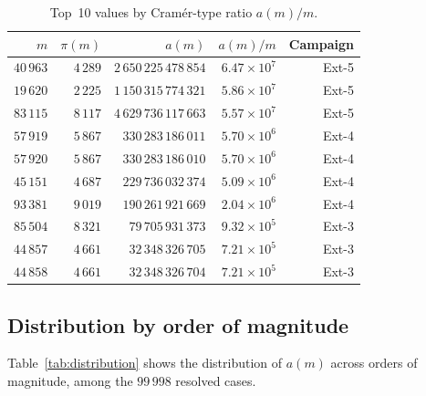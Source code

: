 \documentclass{amsart}
\theoremstyle{definition}
\theoremstyle{remark}
\numberwithin{equation}{section}
\begin{document}
\begin{table}[ht]
\centering
\caption{Top~10 values by Cram\'er-type ratio $a(m)/m$.}
\label{tab:top10_ratio}
\small
\begin{tabular}{rrrrr}
\toprule
$m$ & $\pi(m)$ & $a(m)$ & $a(m)/m$ & Campaign \\
\midrule
$40\,963$ & $4\,289$ & $2\,650\,225\,478\,854$ & $6.47 \times 10^7$ & Ext-5 \\
$19\,620$ & $2\,225$ & $1\,150\,315\,774\,321$ & $5.86 \times 10^7$ & Ext-5 \\
$83\,115$ & $8\,117$ & $4\,629\,736\,117\,663$ & $5.57 \times 10^7$ & Ext-5 \\
$57\,919$ & $5\,867$ & $330\,283\,186\,011$ & $5.70 \times 10^6$ & Ext-4 \\
$57\,920$ & $5\,867$ & $330\,283\,186\,010$ & $5.70 \times 10^6$ & Ext-4 \\
$45\,151$ & $4\,687$ & $229\,736\,032\,374$ & $5.09 \times 10^6$ & Ext-4 \\
$93\,381$ & $9\,019$ & $190\,261\,921\,669$ & $2.04 \times 10^6$ & Ext-4 \\
$85\,504$ & $8\,321$ & $79\,705\,931\,373$ & $9.32 \times 10^5$ & Ext-3 \\
$44\,857$ & $4\,661$ & $32\,348\,326\,705$ & $7.21 \times 10^5$ & Ext-3 \\
$44\,858$ & $4\,661$ & $32\,348\,326\,704$ & $7.21 \times 10^5$ & Ext-3 \\
\bottomrule
\end{tabular}
\end{table}

\subsection{Distribution by order of magnitude}

Table~\ref{tab:distribution} shows the distribution of $a(m)$
across orders of magnitude, among the $99\,998$ resolved cases.
\end{document}

